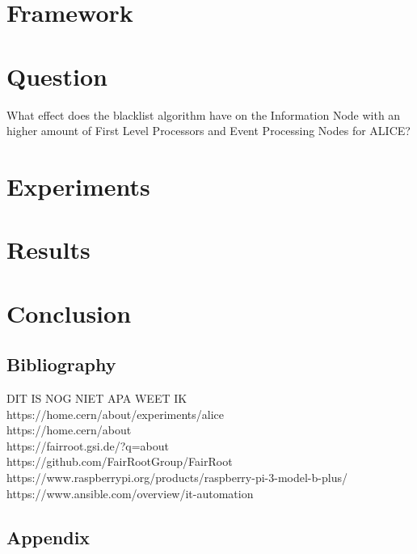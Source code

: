\documentclass{report}
\begin{document}


\newpage

\chapter{Framework}



\chapter{Question}
What effect does the blacklist algorithm have on the Information Node with an higher amount of First Level Processors and Event Processing Nodes for ALICE?

\chapter{Experiments}



\chapter{Results}

\chapter{Conclusion}

\section*{Bibliography}
DIT IS NOG NIET APA WEET IK\\
https://home.cern/about/experiments/alice\\
https://home.cern/about\\
https://fairroot.gsi.de/?q=about\\
https://github.com/FairRootGroup/FairRoot\\
https://www.raspberrypi.org/products/raspberry-pi-3-model-b-plus/\\
https://www.ansible.com/overview/it-automation\\


\section{Appendix}
\end{document}

